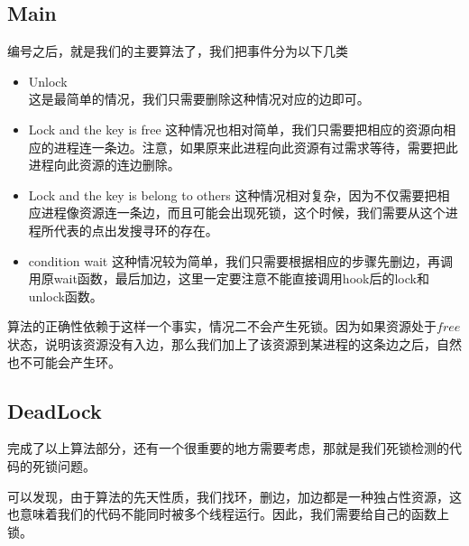 \documentclass[titlepage]{article}
\begin{document}
\subsection{Main}
\indent 编号之后，就是我们的主要算法了，我们把事件分为以下几类
\begin{itemize}
	\item Unlock\\
这是最简单的情况，我们只需要删除这种情况对应的边即可。
	\item Lock and the key is free
这种情况也相对简单，我们只需要把相应的资源向相应的进程连一条边。注意，如果原来此进程向此资源有过需求等待，需要把此进程向此资源的连边删除。
	\item Lock and the key is belong to others
这种情况相对复杂，因为不仅需要把相应进程像资源连一条边，而且可能会出现死锁，这个时候，我们需要从这个进程所代表的点出发搜寻环的存在。
	\item condition wait
这种情况较为简单，我们只需要根据相应的步骤先删边，再调用原wait函数，最后加边，这里一定要注意不能直接调用hook后的lock和unlock函数。
\end{itemize}

\indent 算法的正确性依赖于这样一个事实，情况二不会产生死锁。因为如果资源处于$free$状态，说明该资源没有入边，那么我们加上了该资源到某进程的这条边之后，自然也不可能会产生环。

\subsection{DeadLock}
\indent 完成了以上算法部分，还有一个很重要的地方需要考虑，那就是我们死锁检测的代码的死锁问题。

\indent 可以发现，由于算法的先天性质，我们找环，删边，加边都是一种独占性资源，这也意味着我们的代码不能同时被多个线程运行。因此，我们需要给自己的函数上锁。
\end{document}
